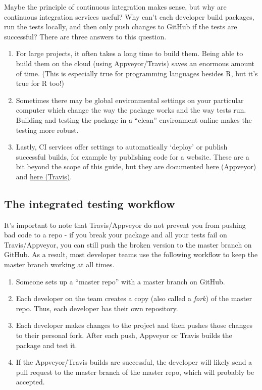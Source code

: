 \documentclass[
]{book}
\providecommand{\tightlist}{%
  \setlength{\itemsep}{0pt}\setlength{\parskip}{0pt}}
\begin{document}
Maybe the principle of continuous integration makes sense, but why are continuous integration services useful? Why can't each developer build packages, run the tests locally, and then only push changes to GitHub if the tests are successful? There are three answers to this question.

\begin{enumerate}
\def\labelenumi{\arabic{enumi}.}
\tightlist
\item
  For large projects, it often takes a long time to build them. Being able to build them on the cloud (using Appveyor/Travis) saves an enormous amount of time. (This is especially true for programming languages besides R, but it's true for R too!)
\item
  Sometimes there may be global environmental settings on your particular computer which change the way the package works and the way tests run. Building and testing the package in a ``clean'' environment online makes the testing more robust.
\item
  Lastly, CI services offer settings to automatically `deploy' or publish successful builds, for example by publishing code for a website. These are a bit beyond the scope of this guide, but they are documented \href{https://www.appveyor.com/docs/deployment/}{here (Appveyor)} and \href{https://docs.travis-ci.com/user/deployment/}{here (Travis)}.
\end{enumerate}

\hypertarget{the-integrated-testing-workflow}{%
\subsection{The integrated testing workflow}\label{the-integrated-testing-workflow}}

It's important to note that Travis/Appveyor do not prevent you from pushing bad code to a repo - if you break your package and all your tests fail on Travis/Appveyor, you can still push the broken version to the master branch on GitHub. As a result, most developer teams use the following workflow to keep the master branch working at all times.

\begin{enumerate}
\def\labelenumi{\arabic{enumi}.}
\tightlist
\item
  Someone sets up a ``master repo'' with a master branch on GitHub.
\item
  Each developer on the team creates a copy (also called a \emph{fork}) of the master repo. Thus, each developer has their own repository.
\item
  Each developer makes changes to the project and then pushes those changes to their personal fork. After each push, Appveyor or Travis builds the package and test it.
\item
  If the Appveyor/Travis builds are successful, the developer will likely send a pull request to the master branch of the master repo, which will probably be accepted.
\end{enumerate}
\end{document}
